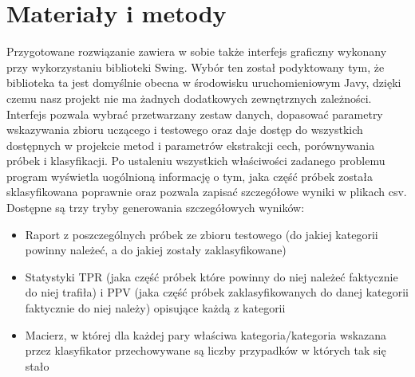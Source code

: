 \documentclass[a4paper]{classrep}
\begin{document}
\section{Materiały i metody}

Przygotowane rozwiązanie zawiera w sobie także interfejs graficzny wykonany
przy wykorzystaniu biblioteki Swing. Wybór ten został podyktowany tym, że
biblioteka ta jest domyślnie obecna w środowisku uruchomieniowym Javy,
dzięki czemu nasz projekt nie ma żadnych dodatkowych zewnętrznych zależności.
Interfejs pozwala wybrać przetwarzany zestaw danych, dopasować parametry
wskazywania zbioru uczącego i testowego oraz daje dostęp do wszystkich
dostępnych w projekcie metod i parametrów ekstrakcji cech, porównywania próbek
i klasyfikacji. Po ustaleniu wszystkich właściwości zadanego problemu
program wyświetla uogólnioną informację o tym, jaka część próbek została sklasyfikowana
poprawnie oraz pozwala zapisać szczegółowe wyniki w plikach csv. Dostępne są
trzy tryby generowania szczegółowych wyników:
\begin{itemize}
\item Raport z poszczególnych próbek ze zbioru testowego (do jakiej kategorii powinny należeć, a do jakiej zostały zaklasyfikowane)
\item Statystyki TPR (jaka część próbek które powinny do niej należeć faktycznie do niej trafiła) i PPV (jaka część próbek zaklasyfikowanych do danej kategorii faktycznie do niej należy) opisujące każdą z kategorii
\item Macierz, w której dla każdej pary właściwa kategoria/kategoria wskazana przez klasyfikator przechowywane są liczby przypadków w których tak się stało
\end{itemize}
\end{document}
